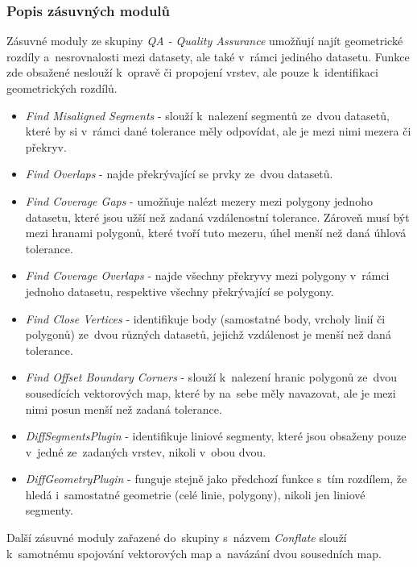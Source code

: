 \subsubsection{Popis zásuvných modulů}
\label{jcs-plugin}

Zásuvné moduly ze skupiny \textit{QA - Quality Assurance} umožňují najít
geometrické rozdíly a~nesrovnalosti mezi datasety, ale také v~rámci jediného
datasetu. Funkce zde obsažené neslouží k~opravě či propojení vrstev, ale 
pouze k~identifikaci geometrických rozdílů.

\begin{itemize}
 \item \textit{Find Misaligned Segments} - slouží k~nalezení segmentů 
    ze~dvou datasetů, které by si v~rámci dané tolerance měly odpovídat,
    ale je mezi nimi mezera či překryv. 
 \item \textit{Find Overlaps} - najde překrývající se prvky ze~dvou datasetů.
 \item \textit{Find Coverage Gaps} - umožňuje nalézt mezery mezi polygony
    jednoho datasetu, které jsou užší než zadaná vzdálenostní tolerance.
    Zároveň musí být mezi hranami polygonů, které tvoří tuto mezeru, úhel menší
    než daná úhlová tolerance.
 \item \textit{Find Coverage Overlaps} - najde všechny překryvy mezi polygony
    v~rámci jednoho data\-setu, respektive všechny překrývající se polygony.
 \item \textit{Find Close Vertices} - identifikuje body (samostatné body,
    vrcholy linií či polygonů) ze~dvou různých datasetů, jejichž vzdálenost
    je menší než daná tolerance.
 \item \textit{Find Offset Boundary Corners} - slouží k~nalezení hranic
    polygonů ze~dvou sou\-sedících vektorových map, které by na~sebe měly
    navazovat, ale je mezi nimi posun menší než zadaná tolerance.
 \item \textit{DiffSegmentsPlugin} - identifikuje liniové segmenty, které
    jsou obsaženy pouze v~jedné ze~zadaných vrstev, nikoli v~obou dvou.
 \item \textit{DiffGeometryPlugin} - funguje stejně jako předchozí funkce
    s~tím rozdílem, že hledá i~samostatné geometrie (celé linie, polygony),
    nikoli jen liniové segmenty.
\end{itemize}

Další zásuvné moduly zařazené do~skupiny s~názvem \textit{Conflate} slouží
k~samo\-tnému spojování vektorových map a~navázání dvou sousedních map.

